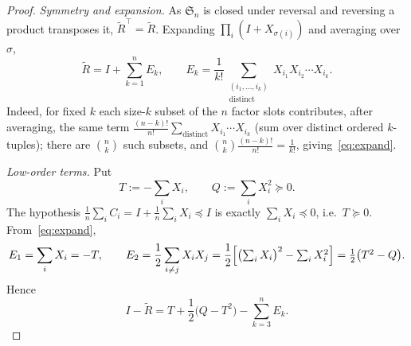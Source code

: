 \documentclass[10pt,a4paper]{amsart}
\newcommand{\Sn}{\mathfrak{S}_n}
\newcommand{\psdge}{\succeq}
\newcommand{\psdle}{\preceq}
\begin{document}
\begin{proof}
\emph{Symmetry and expansion.} As $\Sn$ is closed under reversal and reversing a product transposes
it, $\widetilde R^\top=\widetilde R$. Expanding $\prod_i(I+X_{\sigma(i)})$ and averaging over $\sigma$,
\begin{equation}\label{eq:expand}
\widetilde R=I+\sum_{k=1}^n E_k,\qquad
E_k=\frac1{k!}\sum_{\substack{(i_1,\dots,i_k)\\ \text{distinct}}}X_{i_1}X_{i_2}\cdots X_{i_k}.
\end{equation}
Indeed, for fixed $k$ each size-$k$ subset of the $n$ factor slots contributes, after averaging,
the same term $\frac{(n-k)!}{n!}\sum_{\text{distinct}}X_{i_1}\cdots X_{i_k}$ (sum over distinct
ordered $k$-tuples); there are $\binom nk$ such subsets, and $\binom nk\frac{(n-k)!}{n!}=\frac1{k!}$,
giving~\eqref{eq:expand}.

\emph{Low-order terms.} Put
\[
T:=-\sum_iX_i,\qquad Q:=\sum_iX_i^2\psdge0.
\]
The hypothesis $\frac1n\sum_iC_i=I+\frac1n\sum_iX_i\psdle I$ is exactly $\sum_iX_i\psdle0$, i.e.\
$T\psdge0$. From~\eqref{eq:expand},
\[
E_1=\sum_iX_i=-T,\qquad
E_2=\frac12\sum_{i\ne j}X_iX_j=\frac12\Bigl[\bigl(\textstyle\sum_iX_i\bigr)^2-\sum_iX_i^2\Bigr]
=\frac12\bigl(T^2-Q\bigr).
\]
Hence
\begin{equation}\label{eq:IR}
I-\widetilde R=T+\frac12\bigl(Q-T^2\bigr)-\sum_{k=3}^n E_k.
\end{equation}


\end{proof}
\end{document}
